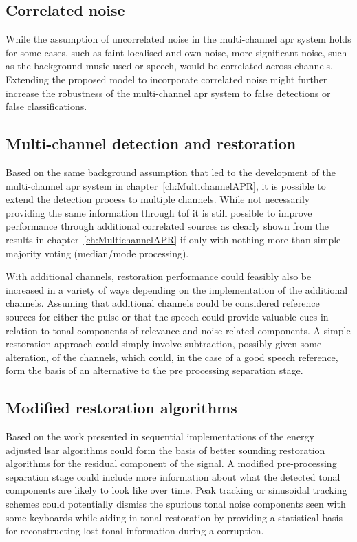 \subsection{Correlated noise}
While the assumption of uncorrelated noise in the multi-channel \gls{apr} system holds for some cases, such as faint localised and own-noise, more significant noise, such as the background music used or speech, would be correlated across channels. Extending the proposed model to incorporate correlated noise might further increase the robustness of the multi-channel \gls{apr} system to false detections or false classifications.

\subsection{Multi-channel detection and restoration}
Based on the same background assumption that led to the development of the multi-channel \gls{apr} system in chapter~\ref{ch:MultichannelAPR}, it is possible to extend the detection process to multiple channels. While not necessarily providing the same information through \gls{tof} it is still possible to improve performance through additional correlated sources as clearly shown from the results in chapter~\ref{ch:MultichannelAPR} if only with nothing more than simple majority voting (median/mode processing).

With additional channels, restoration performance could feasibly also be increased in a variety of ways depending on the implementation of the additional channels. Assuming that additional channels could be considered reference sources for either the pulse or that the speech could provide valuable cues in relation to tonal components of relevance and noise-related components. A simple restoration approach could simply involve subtraction, possibly given some alteration, of the channels, which could, in the case of a good speech reference, form the basis of an alternative to the pre processing separation stage.

\subsection{Modified restoration algorithms}
Based on the work presented in \cite{Esquef2006} sequential implementations of the energy adjusted \gls{lsar} algorithms could form the basis of better sounding restoration algorithms for the residual component of the signal. A modified pre-processing separation stage could include more information about what the detected tonal components are likely to look like over time. Peak tracking or sinusoidal tracking schemes \cite{McAulay1986} could potentially dismiss the spurious tonal noise components seen with some keyboards while aiding in tonal restoration by providing a statistical basis for reconstructing lost tonal information during a corruption.

